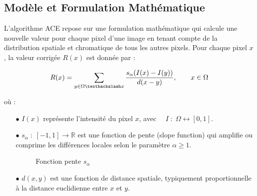 \documentclass[10pt, a4paper]{extarticle}
\numberwithin{equation}{section}
\numberwithin{figure}{section}
\begin{document}
\subsection{Modèle et Formulation Mathématique}

\par L'algorithme ACE repose sur une formulation mathématique qui calcule une nouvelle valeur pour chaque pixel d'une image en tenant compte de la distribution spatiale et chromatique de tous les autres pixels. Pour chaque pixel \( x \), la valeur corrigée \( R(x) \) est donnée par :

\begin{equation}
R(x) = \displaystyle\sum_{y \in \Omega \textbackslash x}\dfrac{ s_\alpha(I(x) - I(y))}{d(x-y)}, \quad\quad x\in \Omega
\label{R(x)1}
\end{equation}

où :
\begin{itemize}
    \item[$\bullet$] \( I(x) \) représente l'intensité du pixel \( x \), avec $\quad I\;:\; \Omega \longleftrightarrow [0,1]$.
    \item[$\bullet$] \( s_\alpha \;:\; [-1,1] \longrightarrow \mathbb{R}\) est une fonction de pente (slope function) qui amplifie ou comprime les différences locales selon le paramètre \(\alpha \geq 1\).

\begin{figure}[h]
\begin{center}
\end{center}
\label{figure4.1}
\caption{Fonction pente $s_\alpha$}
\end{figure} 

\item[$\bullet$] \( d(x, y) \) est une fonction de distance spatiale, typiquement proportionnelle à la distance euclidienne entre \( x \) et \( y \).
\end{itemize}
\end{document}
